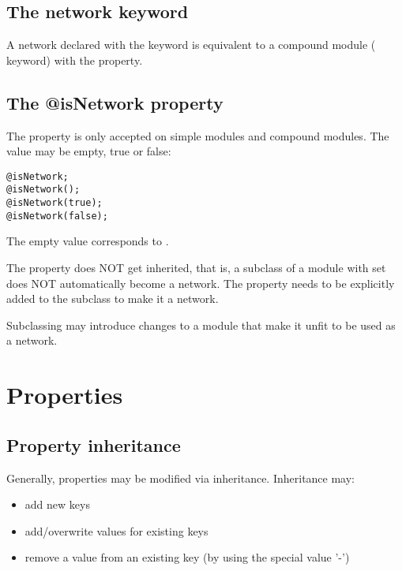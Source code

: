 \subsection{The network keyword}

A network declared with the  keyword is equivalent to a compound
module ( keyword) with the  property.

\subsection{The @isNetwork property}

The  property is only accepted on simple modules and
compound modules. The value may be empty, true or false:

\begin{verbatim}
@isNetwork;
@isNetwork();
@isNetwork(true);
@isNetwork(false);
\end{verbatim}

The empty value corresponds to .

The  property does NOT get inherited, that is, a subclass
of a module with  set does NOT automatically become a network.
The  property needs to be explicitly added to the subclass
to make it a network.

\begin{rationale}
	Subclassing may introduce changes to a module that make it unfit to be used
	as a network.
\end{rationale}



\section{Properties}

\subsection{Property inheritance}

Generally, properties may be modified via inheritance. Inheritance may:

\begin{itemize}
    \item add new keys
    \item add/overwrite values for existing keys
    \item remove a value from an existing key (by using the special value '-')
\end{itemize}



